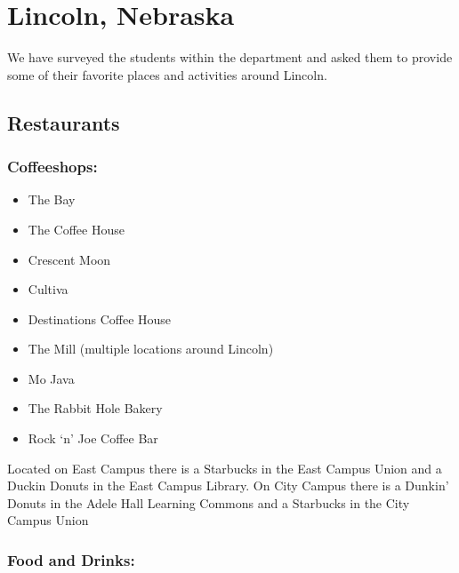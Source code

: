 \documentclass[
  12pt,
]{book}
\providecommand{\tightlist}{%
  \setlength{\itemsep}{0pt}\setlength{\parskip}{0pt}}
\begin{document}
\hypertarget{lincoln-NE}{%
\chapter{Lincoln, Nebraska}\label{lincoln-NE}}

We have surveyed the students within the department and asked them to provide some of their favorite places and activities around Lincoln.

\hypertarget{restaurants}{%
\section{Restaurants}\label{restaurants}}

\hypertarget{coffeeshops}{%
\subsection{Coffeeshops:}\label{coffeeshops}}

\begin{itemize}
\tightlist
\item
  The Bay
\item
  The Coffee House
\item
  Crescent Moon
\item
  Cultiva
\item
  Destinations Coffee House
\item
  The Mill (multiple locations around Lincoln)
\item
  Mo Java
\item
  The Rabbit Hole Bakery
\item
  Rock `n' Joe Coffee Bar
\end{itemize}

Located on East Campus there is a Starbucks in the East Campus Union and a Duckin Donuts in the East Campus Library. On City Campus there is a Dunkin' Donuts in the Adele Hall Learning Commons and a Starbucks in the City Campus Union

\hypertarget{food-and-drinks}{%
\subsection{Food and Drinks:}\label{food-and-drinks}}
\end{document}
